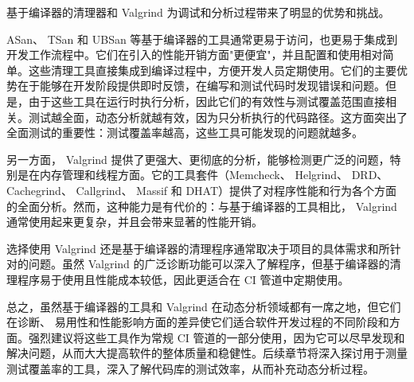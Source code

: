 基于编译器的清理器和 Valgrind 为调试和分析过程带来了明显的优势和挑战。

ASan、 TSan 和 UBSan 等基于编译器的工具通常更易于访问，也更易于集成到开发工作流程中。它们在引入的性能开销方面"更便宜"，并且配置和使用相对简单。这些清理工具直接集成到编译过程中，方便开发人员定期使用。它们的主要优势在于能够在开发阶段提供即时反馈，在编写和测试代码时发现错误和问题。但是，由于这些工具在运行时执行分析，因此它们的有效性与测试覆盖范围直接相关。测试越全面，动态分析就越有效，因为只分析执行的代码路径。这方面突出了全面测试的重要性：测试覆盖率越高，这些工具可能发现的问题就越多。

另一方面， Valgrind 提供了更强大、更彻底的分析，能够检测更广泛的问题，特别是在内存管理和线程方面。它的工具套件（Memcheck、 Helgrind、 DRD、 Cachegrind、 Callgrind、 Massif 和 DHAT）提供了对程序性能和行为各个方面的全面分析。然而，这种能力是有代价的：与基于编译器的工具相比， Valgrind 通常使用起来更复杂，并且会带来显著的性能开销。

选择使用 Valgrind 还是基于编译器的清理程序通常取决于项目的具体需求和所针对的问题。虽然 Valgrind 的广泛诊断功能可以深入了解程序，但基于编译器的清理程序易于使用且性能成本较低，因此更适合在 CI 管道中定期使用。

总之，虽然基于编译器的工具和 Valgrind 在动态分析领域都有一席之地，但它们在诊断、 易用性和性能影响方面的差异使它们适合软件开发过程的不同阶段和方面。强烈建议将这些工具作为常规 CI 管道的一部分使用，因为它可以尽早发现和解决问题，从而大大提高软件的整体质量和稳健性。后续章节将深入探讨用于测量测试覆盖率的工具，深入了解代码库的测试效率，从而补充动态分析过程。
